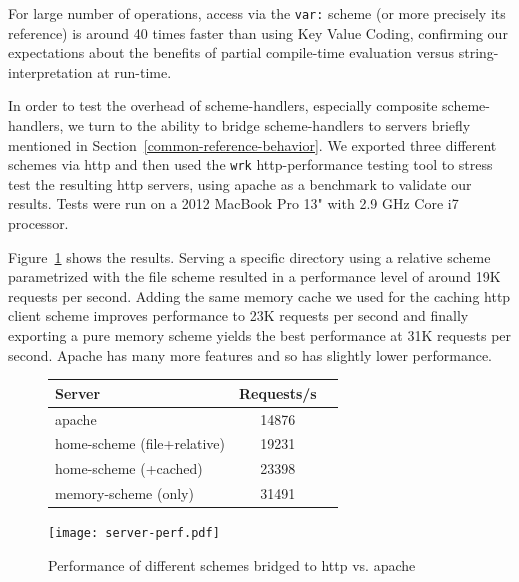 \documentclass[preprint]{sigplanconf}
\begin{document}
For large number of operations, access via the {\tt var:} scheme (or more precisely its reference) is
around 40 times faster than using Key Value Coding, confirming our expectations about the benefits
of partial compile-time evaluation versus string-interpretation at run-time.  

In order to test the overhead of scheme-handlers, especially composite scheme-handlers, we turn
to the ability to bridge scheme-handlers to servers briefly mentioned in Section~\ref{common-reference-behavior}.
We exported three different schemes via http and then used the {\tt wrk} http-performance testing tool to stress
test the resulting http servers, using apache as a benchmark to validate our results.  Tests were run on a 2012 MacBook Pro 13" with 2.9 GHz Core i7 processor.

Figure~\ref{http-server-speed} shows the results.  Serving a specific directory using a relative scheme parametrized
with the file scheme resulted in a performance level of around 19K requests per second.  Adding the same memory cache
we used for the caching http client scheme improves performance to 23K requests per second and finally exporting a pure
memory scheme yields the best performance at 31K requests per second.   Apache has many more features and so
has slightly lower performance.

\begin{figure}
\begin{minipage}[c]{0.58\textwidth}
\begin{tabular}{|l|c|c|} \hline
Server   &  Requests/s    \\ \hline
apache & 	14876	      \\ %
home-scheme (file+relative) &  19231   \\ %
home-scheme (+cached)  &  23398  \\ %
memory-scheme (only) &  31491  \\ \hline
\end{tabular}
\end{minipage}
\begin{minipage}[c]{0.58\textwidth}
\texttt{[image: server-perf.pdf]}
\end{minipage}
\vspace{-2.0em}
\caption{Performance of different schemes bridged to http vs. apache}
\label{http-server-speed}
\end{figure}



\end{document}
